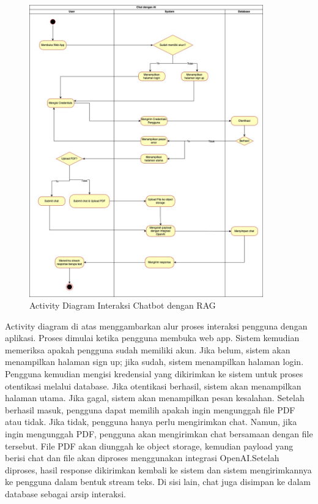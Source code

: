 \begin{figure}[H]
  \centering
  \includegraphics[width=0.9\textwidth]{images/bab-3/sitemap.jpg}
  \caption{Activity Diagram Interaksi Chatbot dengan RAG}
  \label{fig:activity}
\end{figure}

Activity diagram di atas menggambarkan alur proses interaksi pengguna dengan aplikasi. Proses dimulai ketika pengguna membuka web app. Sistem kemudian memeriksa apakah pengguna sudah memiliki akun. Jika belum, sistem akan menampilkan halaman sign up; jika sudah, sistem menampilkan halaman login. Pengguna kemudian mengisi kredensial yang dikirimkan ke sistem untuk proses otentikasi melalui database. Jika otentikasi berhasil, sistem akan menampilkan halaman utama. Jika gagal, sistem akan menampilkan pesan kesalahan.
\singlespacing{}
Setelah berhasil masuk, pengguna dapat memilih apakah ingin mengunggah file PDF atau tidak. Jika tidak, pengguna hanya perlu mengirimkan chat. Namun, jika ingin mengunggah PDF, pengguna akan mengirimkan chat bersamaan dengan file tersebut. File PDF akan diunggah ke object storage, kemudian payload yang berisi chat dan file akan diproses menggunakan integrasi OpenAI.\@ Setelah diproses, hasil response dikirimkan kembali ke sistem dan sistem mengirimkannya ke pengguna dalam bentuk stream teks. Di sisi lain, chat juga disimpan ke dalam database sebagai arsip interaksi.

